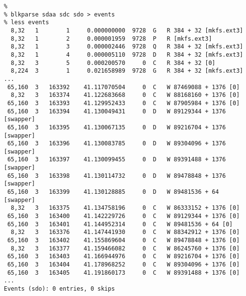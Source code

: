 \documentclass{article}
\begin{document}
\begin{verbatim}
%
% blkparse sdaa sdc sdo > events
% less events
  8,32   1        1     0.000000000  9728  G   R 384 + 32 [mkfs.ext3]
  8,32   1        2     0.000001959  9728  P   R [mkfs.ext3]
  8,32   1        3     0.000002446  9728  Q   R 384 + 32 [mkfs.ext3]
  8,32   1        4     0.000005110  9728  D   R 384 + 32 [mkfs.ext3]
  8,32   3        5     0.000200570     0  C   R 384 + 32 [0]
  8,224  3        1     0.021658989  9728  G   R 384 + 32 [mkfs.ext3]
...
 65,160  3   163392    41.117070504     0  C   W 87469088 + 1376 [0]
  8,32   3   163374    41.122683668     0  C   W 88168160 + 1376 [0]
 65,160  3   163393    41.129952433     0  C   W 87905984 + 1376 [0]
 65,160  3   163394    41.130049431     0  D   W 89129344 + 1376 [swapper]
 65,160  3   163395    41.130067135     0  D   W 89216704 + 1376 [swapper]
 65,160  3   163396    41.130083785     0  D   W 89304096 + 1376 [swapper]
 65,160  3   163397    41.130099455     0  D   W 89391488 + 1376 [swapper]
 65,160  3   163398    41.130114732     0  D   W 89478848 + 1376 [swapper]
 65,160  3   163399    41.130128885     0  D   W 89481536 + 64 [swapper]
  8,32   3   163375    41.134758196     0  C   W 86333152 + 1376 [0]
 65,160  3   163400    41.142229726     0  C   W 89129344 + 1376 [0]
 65,160  3   163401    41.144952314     0  C   W 89481536 + 64 [0]
  8,32   3   163376    41.147441930     0  C   W 88342912 + 1376 [0]
 65,160  3   163402    41.155869604     0  C   W 89478848 + 1376 [0]
  8,32   3   163377    41.159466082     0  C   W 86245760 + 1376 [0]
 65,160  3   163403    41.166944976     0  C   W 89216704 + 1376 [0]
 65,160  3   163404    41.178968252     0  C   W 89304096 + 1376 [0]
 65,160  3   163405    41.191860173     0  C   W 89391488 + 1376 [0]
...
Events (sdo): 0 entries, 0 skips


\end{verbatim}
\end{document}
